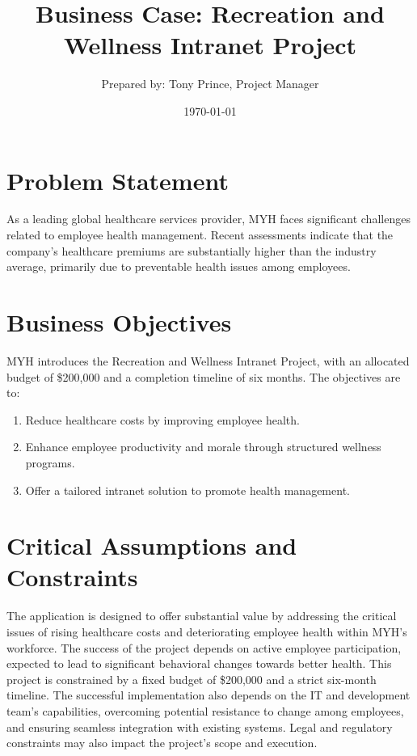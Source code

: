 \documentclass{article}
\title{Business Case: Recreation and Wellness Intranet Project}
\author{Prepared by: Tony Prince, Project Manager}
\date{\today}
\begin{document}
\maketitle

\section*{Problem Statement}
As a leading global healthcare services provider, MYH faces significant challenges related to employee health management. Recent assessments indicate that the company's healthcare premiums are substantially higher than the industry average, primarily due to preventable health issues among employees.

\section*{Business Objectives}
MYH introduces the Recreation and Wellness Intranet Project, with an allocated budget of \$200,000 and a completion timeline of six months. The objectives are to:
\begin{enumerate}
    \item Reduce healthcare costs by improving employee health.
    \item Enhance employee productivity and morale through structured wellness programs.
    \item Offer a tailored intranet solution to promote health management.
\end{enumerate}

\section*{Critical Assumptions and Constraints}
The application is designed to offer substantial value by addressing the critical issues of rising healthcare costs and deteriorating employee health within MYH's workforce. The success of the project depends on active employee participation, expected to lead to significant behavioral changes towards better health. This project is constrained by a fixed budget of \$200,000 and a strict six-month timeline. The successful implementation also depends on the IT and development team's capabilities, overcoming potential resistance to change among employees, and ensuring seamless integration with existing systems. Legal and regulatory constraints may also impact the project's scope and execution.
\end{document}
